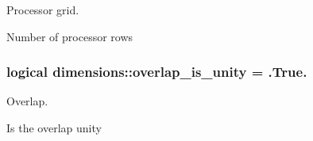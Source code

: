 Processor grid. 

Number of processor rows \hypertarget{namespacedimensions_a93911be2b2a6f6b0dda974846dbf5973}{}
\subsubsection[{overlap\+\_\+is\+\_\+unity}]{\setlength{\rightskip}{0pt plus 5cm}logical dimensions\+::overlap\+\_\+is\+\_\+unity = .True.}\label{namespacedimensions_a93911be2b2a6f6b0dda974846dbf5973}


Overlap. 

Is the overlap unity 